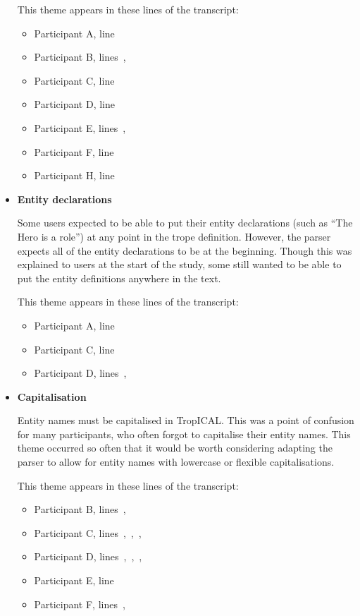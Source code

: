 \documentclass[11pt]{report}
\begin{document}
\begin{itemize}
This theme appears in these lines of the transcript:

\begin{itemize}
\item Participant A, line~
\item Participant B, lines~,~
\item Participant C, line~
\item Participant D, line~
\item Participant E, lines~,~
\item Participant F, line~
\item Participant H, line~
\end{itemize}

\item \textbf{Entity declarations}

Some users expected to be able to put their entity declarations (such as ``The
Hero is a role'') at any point in the trope definition. However, the parser
expects all of the entity declarations to be at the beginning. Though this was
explained to users at the start of the study, some still wanted to be able to
put the entity definitions anywhere in the text.

This theme appears in these lines of the transcript:

\begin{itemize}
\item Participant A, line~
\item Participant C, line~
\item Participant D, lines~,~
\end{itemize}
  
\item \textbf{Capitalisation}

Entity names must be capitalised in TropICAL. This was a point of confusion for
many participants, who often forgot to capitalise their entity names. This theme
occurred so often that it would be worth considering adapting the parser to
allow for entity names with lowercase or flexible capitalisations.

This theme appears in these lines of the transcript:

\begin{itemize}
\item Participant B, lines~,~
\item Participant C, lines~,~,~,~
\item Participant D, lines~,~,~,~
\item Participant E, line~
\item Participant F, lines~,~
\end{itemize}
\end{itemize}
\end{document}
